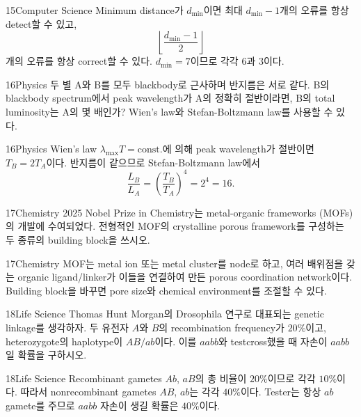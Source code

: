 \documentclass[12pt,aspectratio=169]{beamer}
\begin{document}
\begin{solutionframe}{15}{Computer Science}
Minimum distance가 $d_{\min}$이면 최대 $d_{\min}-1$개의 오류를 항상 detect할 수 있고,
\[
\left\lfloor\frac{d_{\min}-1}{2}\right\rfloor
\]
개의 오류를 항상 correct할 수 있다. $d_{\min}=7$이므로 각각 $6$과 $3$이다.
\end{solutionframe}

\begin{problemframe}{16}{Physics}
두 별 A와 B를 모두 blackbody로 근사하며 반지름은 서로 같다. B의 blackbody spectrum에서 peak wavelength가 A의 정확히 절반이라면, B의 total luminosity는 A의 몇 배인가? Wien's law와 Stefan-Boltzmann law를 사용할 수 있다.
\end{problemframe}

\begin{solutionframe}{16}{Physics}
Wien's law $\lambda_{\max}T=\mathrm{const.}$에 의해 peak wavelength가 절반이면 $T_B=2T_A$이다. 반지름이 같으므로 Stefan-Boltzmann law에서
\[
\frac{L_B}{L_A}
=\left(\frac{T_B}{T_A}\right)^4
=2^4=16.
\]
\end{solutionframe}

\begin{problemframe}{17}{Chemistry}
2025 Nobel Prize in Chemistry는 metal-organic frameworks (MOFs)의 개발에 수여되었다. 전형적인 MOF의 crystalline porous framework를 구성하는 두 종류의 building block을 쓰시오.
\end{problemframe}

\begin{solutionframe}{17}{Chemistry}
MOF는 metal ion 또는 metal cluster를 node로 하고, 여러 배위점을 갖는 organic ligand/linker가 이들을 연결하여 만든 porous coordination network이다. Building block을 바꾸면 pore size와 chemical environment를 조절할 수 있다.
\end{solutionframe}

\begin{problemframe}{18}{Life Science}
Thomas Hunt Morgan의 Drosophila 연구로 대표되는 genetic linkage를 생각하자. 두 유전자 $A$와 $B$의 recombination frequency가 $20\%$이고, heterozygote의 haplotype이 $AB/ab$이다. 이를 $aabb$와 testcross했을 때 자손이 $aabb$일 확률을 구하시오.
\end{problemframe}

\begin{solutionframe}{18}{Life Science}
Recombinant gametes $Ab$, $aB$의 총 비율이 $20\%$이므로 각각 $10\%$이다. 따라서 nonrecombinant gametes $AB$, $ab$는 각각 $40\%$이다. Tester는 항상 $ab$ gamete를 주므로 $aabb$ 자손이 생길 확률은 $40\%$이다.
\end{solutionframe}
\end{document}

